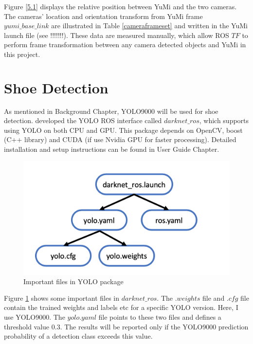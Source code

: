 Figure \ref{5.1} displays the relative position between YuMi and the two cameras. The cameras' location and orientation transform from YuMi frame $yumi\_base\_link$ are illustrated in Table \ref{cameraframeset} and written in the YuMi launch file (see !!!!!!!). These data are measured manually, which allow ROS $TF$ to perform frame transformation between any camera detected objects and YuMi in this project. 
\begin{table}[H]
\centering
{}
\caption{Transform settings between YuMi and cameras}
\label{cameraframeset}
\end{table}

\section{Shoe Detection} \label{shoedetection}
As mentioned in Background Chapter, YOLO9000 will be used for shoe detection. \citep{bjelonicYolo2018} developed the YOLO ROS interface called $darknet\_ros$, which supports using YOLO on both CPU and GPU. This package depends on OpenCV, boost (C++ library) and CUDA (if use Nvidia GPU for faster processing). Detailed installation and setup instructions can be found in User Guide Chapter. 

\begin{figure}[H]
\centering
\includegraphics[width = 0.5\columnwidth]{Implementation/cv/yolofile.png}
\caption{Important files in YOLO package}
\label{yolofolder}
\end{figure}

Figure \ref{yolofolder} shows some important files in $darknet\_ros$. The $.weights$ file and $.cfg$ file contain the trained weights and labels etc for a specific YOLO version. Here, I use YOLO9000. The $yolo.yaml$ file points to these two files and defines a threshold value $0.3$. The results will be reported only if the YOLO9000 prediction probability of a detection class exceeds this value. 


